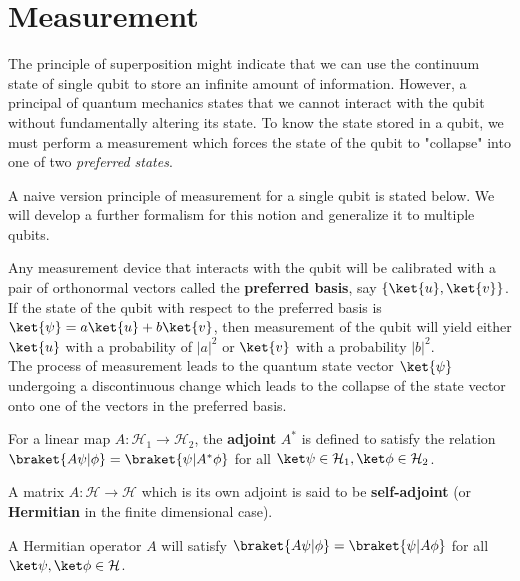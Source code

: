 \section{Measurement}
The principle of superposition might indicate that we can use the continuum state of single qubit to store an infinite amount of information. However, a principal of quantum mechanics states that we cannot interact with the qubit without fundamentally altering its state. To know the state stored in a qubit, we must perform a measurement which forces the state of the qubit to "collapse" into one of two \textit{preferred states}.

A naive version principle of measurement for a single qubit is stated below. We will develop a further formalism for this notion and generalize it to multiple qubits.
\begin{samepage}
\begin{mdframed}
\begin{axiom}
    Any measurement device that interacts with the qubit will be calibrated with a pair of orthonormal vectors called the \textbf{preferred basis}, say $\{ \ket{u}, \ket{v} \}$. If the state of the qubit with respect to the preferred basis is $\ket{\psi} = a \ket{u} + b \ket{v}$, then measurement of the qubit will yield either $\ket{u}$ with a probability of $|a|^2$ or $\ket{v}$ with a probability $|b|^2$. \\
The process of measurement leads to the quantum state vector $\ket{\psi}$ undergoing a discontinuous change which leads to the collapse of the state vector onto one of the vectors in the preferred basis.
\end{axiom}
\end{mdframed}
\end{samepage}

\begin{defn}
    For a linear map $A: \mathcal{H}_1 \to \mathcal{H}_2$, the \textbf{adjoint} $A^*$ is defined to satisfy the relation 
    $\braket{A \psi| \phi} = \braket{\psi | A^* \phi}$ for all $\ket\psi \in \mathcal{H}_1,\ket\phi \in \mathcal{H}_2$.

    A matrix $A: \mathcal{H} \to \mathcal{H}$ which is its own adjoint is said to be \textbf{self-adjoint} (or \textbf{Hermitian} in the finite dimensional case).

    A Hermitian operator $A$ will satisfy $\braket{A \psi | \phi} = \braket{\psi | A \phi}$ for all $\ket\psi, \ket\phi\in \mathcal{H}$.
\end{defn}

